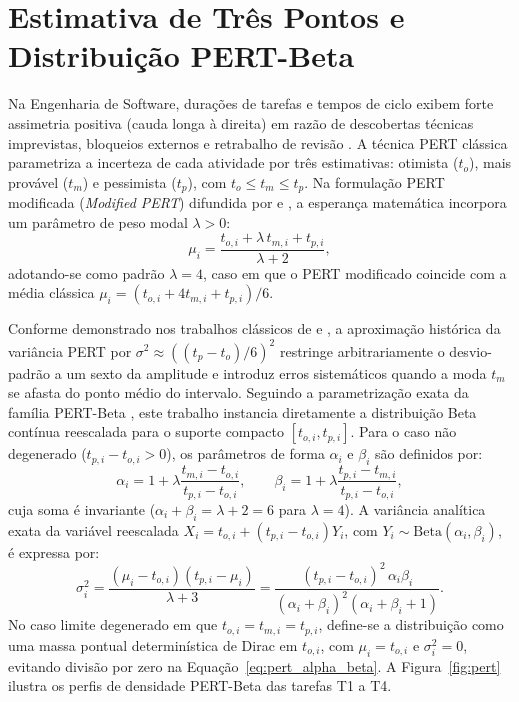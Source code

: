 \documentclass[12pt,openany,oneside,a4paper,english,brazilian,sumario=tradicional]{abntex2}
\begin{document}
\section{Estimativa de Três Pontos e Distribuição PERT-Beta}\label{sec:pert}

Na Engenharia de Software, durações de tarefas e tempos de ciclo exibem forte assimetria positiva (cauda longa à direita) em razão de descobertas técnicas imprevistas, bloqueios externos e retrabalho de revisão \cite{maccrimmon1964,magennis2011,vacanti2015}. A técnica PERT clássica \cite{malcolm1959} parametriza a incerteza de cada atividade por três estimativas: otimista ($t_o$), mais provável ($t_m$) e pessimista ($t_p$), com $t_o \le t_m \le t_p$. Na formulação PERT modificada (\textit{Modified PERT}) difundida por  e , a esperança matemática incorpora um parâmetro de peso modal $\lambda > 0$:
\begin{equation}\label{eq:pert_mean}
\mu_i=\frac{t_{o,i}+\lambda\,t_{m,i}+t_{p,i}}{\lambda+2},
\end{equation}
adotando-se como padrão $\lambda=4$, caso em que o PERT modificado coincide com a média clássica $\mu_i=(t_{o,i}+4t_{m,i}+t_{p,i})/6$.

Conforme demonstrado nos trabalhos clássicos de  e , a aproximação histórica da variância PERT por $\sigma^2 \approx ((t_p-t_o)/6)^2$ restringe arbitrariamente o desvio-padrão a um sexto da amplitude e introduz erros sistemáticos quando a moda $t_m$ se afasta do ponto médio do intervalo. Seguindo a parametrização exata da família PERT-Beta \cite{vose2008,davis2008}, este trabalho instancia diretamente a distribuição Beta contínua reescalada para o suporte compacto $[t_{o,i}, t_{p,i}]$. Para o caso não degenerado ($t_{p,i} - t_{o,i} > 0$), os parâmetros de forma $\alpha_i$ e $\beta_i$ são definidos por:
\begin{equation}\label{eq:pert_alpha_beta}
\alpha_i=1+\lambda\frac{t_{m,i}-t_{o,i}}{t_{p,i}-t_{o,i}},\qquad
\beta_i=1+\lambda\frac{t_{p,i}-t_{m,i}}{t_{p,i}-t_{o,i}},
\end{equation}
cuja soma é invariante ($\alpha_i+\beta_i=\lambda+2=6$ para $\lambda=4$). A variância analítica exata da variável reescalada $X_i = t_{o,i} + (t_{p,i}-t_{o,i})Y_i$, com $Y_i \sim \mathrm{Beta}(\alpha_i,\beta_i)$, é expressa por:
\begin{equation}\label{eq:pert_var}
\sigma_i^2=\frac{(\mu_i-t_{o,i})(t_{p,i}-\mu_i)}{\lambda+3} = \frac{(t_{p,i}-t_{o,i})^2\,\alpha_i\beta_i}{(\alpha_i+\beta_i)^2(\alpha_i+\beta_i+1)}.
\end{equation}
No caso limite degenerado em que $t_{o,i} = t_{m,i} = t_{p,i}$, define-se a distribuição como uma massa pontual determinística de Dirac em $t_{o,i}$, com $\mu_i = t_{o,i}$ e $\sigma_i^2 = 0$, evitando divisão por zero na Equação~\ref{eq:pert_alpha_beta}. A Figura~\ref{fig:pert} ilustra os perfis de densidade PERT-Beta das tarefas T1 a T4.
\end{document}

